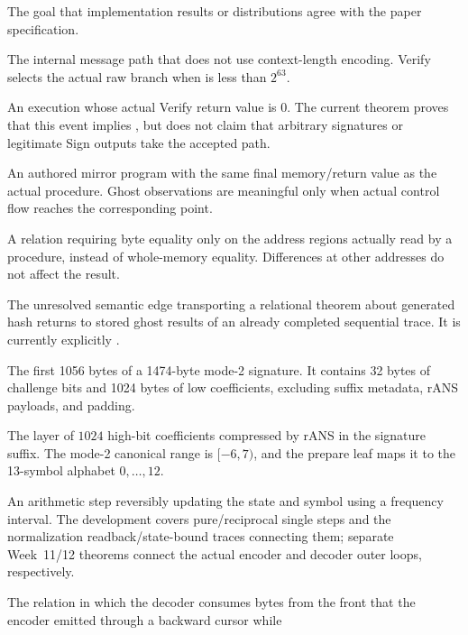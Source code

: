 \begin{description}[style=nextline,leftmargin=3.1cm]
  \item[Functional correctness (FC)] The goal that implementation results or
  distributions agree with the paper specification.
  \item[Raw/internal] The internal message path that does not use context-length
  encoding. Verify selects the actual raw branch when  is
  less than \(2^{63}\).
  \item[Accepted path] An execution whose actual Verify return value is 0. The
  current theorem proves that this event implies , but
  does not claim that arbitrary signatures or legitimate Sign outputs take the accepted path.
  \item[Exact trace] An authored mirror program with the same final memory/return
  value as the actual procedure. Ghost observations are meaningful only when
  actual control flow reaches the corresponding point.
  \item[Region-local] A relation requiring byte equality only on the address
  regions actually read by a procedure, instead of whole-memory equality.
  Differences at other addresses do not affect the result.
  \item[Product/replay boundary] The unresolved semantic edge transporting a
  relational theorem about generated hash returns to stored ghost results of an
  already completed sequential trace. It is currently explicitly \statusdeferred.
  \item[Signature prefix] The first 1056 bytes of a 1474-byte mode-2 signature.
  It contains 32 bytes of challenge bits and 1024 bytes of low coefficients,
  excluding suffix metadata, rANS payloads, and padding.
  \item[HBZ] The layer of \(1024\) high-bit coefficients compressed by rANS in
  the signature suffix. The mode-2 canonical range is \([-6,7)\), and the prepare
  leaf maps it to the 13-symbol alphabet \(0,\ldots,12\).
  \item[rANS step] An arithmetic step reversibly updating the state and symbol
  using a frequency interval. The development covers pure/reciprocal single steps
  and the normalization readback/state-bound traces connecting them; separate
  Week~11/12 theorems connect the actual encoder and decoder outer loops, respectively.
  \item[Normalization-byte stack] The relation in which the decoder consumes
  bytes from the front that the encoder emitted through a backward cursor while

\end{description}
